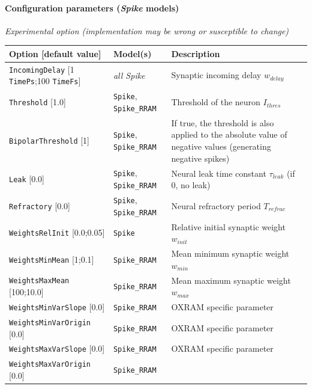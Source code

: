 \documentclass[a4paper,11pt,oneside]{article}
\begin{document}
\paragraph{Configuration parameters (\emph{Spike} models)}

\begin{flushleft}
\emph{Experimental option (implementation may be wrong or susceptible
to change)}
\end{flushleft}
\begin{center}
 \begin{longtable}{| p{4cm} | p{3cm} | p{9cm} | }
 \hline
 Option [default value] & Model(s) & Description\\
 \hline\hline
  \lstinline!IncomingDelay! [1 \lstinline!TimePs!;100 \lstinline!TimeFs!]
  & \emph{all Spike} & Synaptic incoming delay $w_{delay}$ \\
  \lstinline!Threshold! [1.0] & \lstinline!Spike!, \lstinline!Spike_RRAM!
  & Threshold of the neuron $I_{thres}$ \\
  \lstinline!BipolarThreshold! [1] & \lstinline!Spike!, \lstinline!Spike_RRAM!
  & If true, the threshold is also applied to the absolute value of negative
  values (generating negative spikes) \\
  \lstinline!Leak! [0.0] & \lstinline!Spike!, \lstinline!Spike_RRAM!
  & Neural leak time constant $\tau_{leak}$ (if 0, no leak) \\
  \lstinline!Refractory! [0.0] & \lstinline!Spike!, \lstinline!Spike_RRAM!
  & Neural refractory period $T_{refrac}$ \\
  \lstinline!WeightsRelInit! [0.0;0.05] & \lstinline!Spike!
  & Relative initial synaptic weight $w_{init}$ \\
  \lstinline!WeightsMinMean! [1;0.1] & \lstinline!Spike_RRAM!
  & Mean minimum synaptic weight $w_{min}$ \\
  \lstinline!WeightsMaxMean! [100;10.0] & \lstinline!Spike_RRAM!
  & Mean maximum synaptic weight $w_{max}$ \\
  \lstinline!WeightsMinVarSlope! [0.0] & \lstinline!Spike_RRAM!
  & OXRAM specific parameter \\
  \lstinline!WeightsMinVarOrigin! [0.0] & \lstinline!Spike_RRAM!
  & OXRAM specific parameter \\
  \lstinline!WeightsMaxVarSlope! [0.0] & \lstinline!Spike_RRAM!
  & OXRAM specific parameter \\
  \lstinline!WeightsMaxVarOrigin! [0.0] & \lstinline!Spike_RRAM!

\end{longtable}
\end{center}
\end{document}

